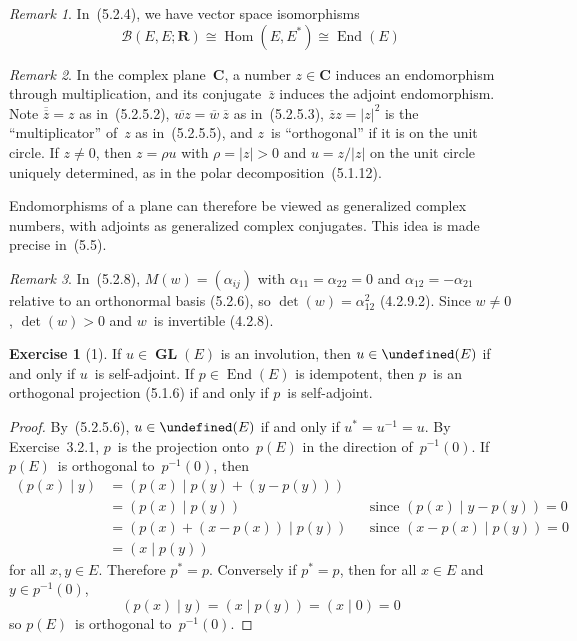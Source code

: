 \documentclass[letterpaper,12pt]{article}
\newcommand{\R}{\mathbf{R}}
\newcommand{\C}{\mathbf{C}}
\newcommand{\B}{\mathcal{B}}
\newcommand{\iso}{\cong}
\let\O\undefined %
\DeclareMathOperator{\Hom}{Hom}
\DeclareMathOperator{\End}{End}
\DeclareMathOperator{\GL}{\mathbf{GL}}
\DeclareMathOperator{\O}{\mathbf{O}}
\newcommand{\inv}[1]{#1^{-1}}
\newcommand{\kerz}[1]{\inv{#1}(0)}
\newcommand{\dual}[1]{#1^*}
\newcommand{\abs}[1]{|{#1}|}
\newcommand{\innerprod}[2]{({#1}\;|\;{#2})}
\newcommand{\conj}[1]{\overline{#1}}
\newcommand{\adj}[1]{#1^*}
\theoremstyle{definition}
\newtheorem*{exer}{Exercise}
\theoremstyle{remark}
\newtheorem*{rmk}{Remark}
\begin{document}
\begin{rmk}
In~(5.2.4), we have vector space isomorphisms
\[\B(E,E;\R)\iso\Hom(E,\dual{E})\iso\End(E)\]
\end{rmk}

\begin{rmk}
In the complex plane~\(\C\), a number \(z\in\C\) induces an endomorphism through multiplication, and its conjugate~\(\conj{z}\) induces the adjoint endomorphism. Note \(\conj{\conj{z}}=z\) as in~(5.2.5.2), \(\conj{wz}=\conj{w}\ \conj{z}\) as in~(5.2.5.3), \(\conj{z}z=\abs{z}^2\) is the ``multiplicator'' of~\(z\) as in~(5.2.5.5), and \(z\)~is ``orthogonal'' if it is on the unit circle. If \(z\ne 0\), then \(z=\rho u\) with \(\rho=\abs{z}>0\) and \(u=z/\abs{z}\) on the unit circle uniquely determined, as in the polar decomposition~(5.1.12).

Endomorphisms of a plane can therefore be viewed as generalized complex numbers, with adjoints as generalized complex conjugates. This idea is made precise in~(5.5).
\end{rmk}

\begin{rmk}
In~(5.2.8), \(M(w)=(\alpha_{ij})\) with \(\alpha_{11}=\alpha_{22}=0\) and \(\alpha_{12}=-\alpha_{21}\) relative to an orthonormal basis (5.2.6), so \(\det(w)=\alpha_{12}^2\) (4.2.9.2). Since \(w\ne 0\), \(\det(w)>0\) and \(w\)~is invertible (4.2.8).
\end{rmk}

\begin{exer}[1]
If \(u\in\GL(E)\) is an involution, then \(u\in\O(E)\) if and only if \(u\)~is self-adjoint. If \(p\in\End(E)\) is idempotent, then \(p\)~is an orthogonal projection (5.1.6) if and only if \(p\)~is self-adjoint.
\end{exer}
\begin{proof}
By~(5.2.5.6), \(u\in\O(E)\) if and only if \(\adj{u}=\inv{u}=u\). By Exercise~3.2.1, \(p\)~is the projection onto~\(p(E)\) in the direction of~\(\kerz{p}\). If \(p(E)\)~is orthogonal to~\(\kerz{p}\), then
\begin{align*}
\innerprod{p(x)}{y}&=\innerprod{p(x)}{p(y)+(y-p(y))}&&\\
	&=\innerprod{p(x)}{p(y)}&&\text{since }\innerprod{p(x)}{y-p(y)}=0\\
	&=\innerprod{p(x)+(x-p(x))}{p(y)}&&\text{since }\innerprod{x-p(x)}{p(y)}=0\\
	&=\innerprod{x}{p(y)}
\end{align*}
for all \(x,y\in E\). Therefore \(\adj{p}=p\). Conversely if \(\adj{p}=p\), then for all \(x\in E\) and \(y\in\kerz{p}\),
\[\innerprod{p(x)}{y}=\innerprod{x}{p(y)}=\innerprod{x}{0}=0\]
so \(p(E)\)~is orthogonal to~\(\kerz{p}\).
\end{proof}
\end{document}
